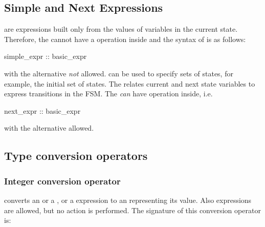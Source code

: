 \subsection{Simple and Next Expressions}
\label{Simple and Next Expressions}

 are expressions built only from the
values of variables in the current state.
%
Therefore, the  cannot have a
 operation inside and the syntax of
 is as follows:
%
\begin{Grammar}
simple_expr :: basic_expr
\end{Grammar}
%
with the alternative  \emph{not}
allowed. 
%
 can be used to specify sets of states,
for example, the initial set of states.
%
The  relates current and next state
variables to express transitions in the FSM. 
%
The  \emph{can} have 
operation inside, i.e.
%
\begin{Grammar}
next_expr :: basic_expr
\end{Grammar}
%
with the alternative  allowed.
%
%

\subsection{Type conversion operators}
\label{Type conversion operators}


\subsubsection{Integer conversion operator}
\label{Integer Conversion Operator}

 converts an \UWord {} or a 
\SWord {}, or a \Boolean expression to an 
\Integer representing its value. Also \Integer expressions are 
allowed, but no action is performed.
%
The signature of this conversion operator is:\\

